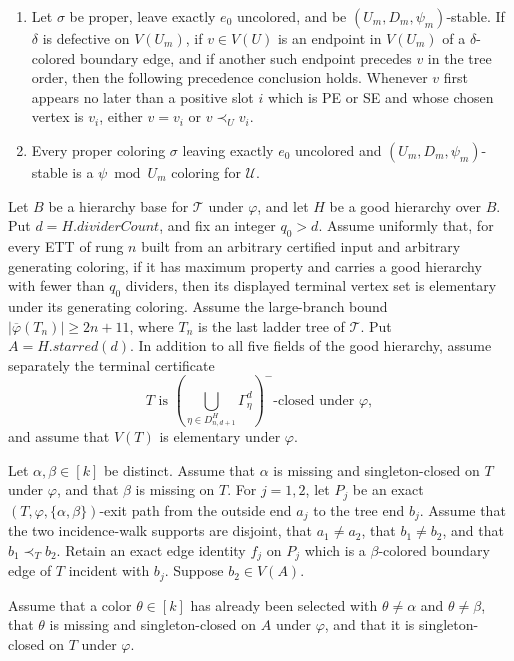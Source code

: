 \begin{lemma}
\begin{enumerate}
exactly $e_0$ uncolored and $(U_m,D_m,\psi_m)$-stable, the full
$(\gamma_m,\delta_m)$ incidence component through $v$ meets $V(U_m)$
exactly in $v$.
\item Let $\sigma$ be proper, leave exactly $e_0$ uncolored, and be
$(U_m,D_m,\psi_m)$-stable.  If $\delta$ is defective on $V(U_m)$, if
$v\in V(U)$ is an endpoint in $V(U_m)$ of a $\delta$-colored boundary
edge, and if another such endpoint precedes $v$ in the tree order, then
the following precedence conclusion holds.  Whenever $v$ first appears
no later than a positive slot $i$ which is PE or SE and whose chosen
vertex is $v_i$, either $v=v_i$ or $v\prec_U v_i$.
\item Every proper coloring $\sigma$ leaving exactly $e_0$ uncolored and
$(U_m,D_m,\psi_m)$-stable is a $\psi\bmod U_m$ coloring for
$\mathcal U$.
\end{enumerate}

Let $B$ be a hierarchy base for $\mathcal T$ under $\varphi$, and let $H$
be a good hierarchy over $B$.  Put $d=H.\mathit{dividerCount}$, and fix an
integer $q_0>d$.  Assume uniformly that, for every ETT of rung $n$ built
from an arbitrary certified input and arbitrary generating coloring, if it
has maximum property and carries a good hierarchy with fewer than $q_0$
dividers, then its displayed terminal vertex set is elementary under its
generating coloring.  Assume the large-branch bound
$|\overline\varphi(T_n)|\geq2n+11$, where $T_n$ is the last ladder tree of
$\mathcal T$.  Put $A=H.\mathit{starred}(d)$.  In addition to all five
fields of the good hierarchy, assume separately the terminal certificate
\[
 T\text{ is }
 \left(\bigcup_{\eta\in D^H_{n,d+1}}\Gamma^d_\eta\right)^-
 \text{-closed under }\varphi,
\]
and assume that $V(T)$ is elementary under $\varphi$.

Let $\alpha,\beta\in[k]$ be distinct.  Assume that $\alpha$ is missing and
singleton-closed on $T$ under $\varphi$, and that $\beta$ is missing on
$T$.  For $j=1,2$, let $P_j$ be an exact
$(T,\varphi,\{\alpha,\beta\})$-exit path from the outside end $a_j$ to the
tree end $b_j$.  Assume that the two incidence-walk supports are disjoint,
that $a_1\ne a_2$, that $b_1\ne b_2$, and that $b_1\prec_T b_2$.  Retain
an exact edge identity $f_j$ on $P_j$ which is a $\beta$-colored boundary
edge of $T$ incident with $b_j$.  Suppose $b_2\in V(A)$.

Assume that a color $\theta\in[k]$ has already been selected with
$\theta\ne\alpha$ and $\theta\ne\beta$, that $\theta$ is missing and
singleton-closed on $A$ under $\varphi$, and that it is singleton-closed
on $T$ under $\varphi$.


\end{lemma}
